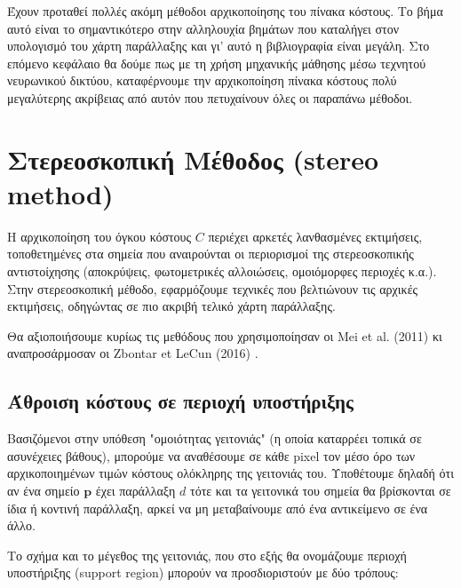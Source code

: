 Έχουν προταθεί πολλές ακόμη μέθοδοι αρχικοποίησης του πίνακα κόστους. Το βήμα αυτό είναι το σημαντικότερο στην αλληλουχία βημάτων που καταλήγει στον υπολογισμό του χάρτη παράλλαξης και γι' αυτό η βιβλιογραφία είναι μεγάλη. Στο επόμενο κεφάλαιο θα δούμε πως με τη χρήση μηχανικής μάθησης μέσω τεχνητού νευρωνικού δικτύου, καταφέρνουμε την αρχικοποίηση πίνακα κόστους πολύ μεγαλύτερης ακρίβειας από αυτόν που πετυχαίνουν όλες οι παραπάνω μέθοδοι.


\section{Στερεοσκοπική Μέθοδος \texorpdfstring{\e (stereo method) \g}{TEXT}}

Η αρχικοποίηση του όγκου κόστους $C$ περιέχει αρκετές λανθασμένες εκτιμήσεις, τοποθετημένες στα σημεία που αναιρούνται οι περιορισμοί της στερεοσκοπικής αντιστοίχησης (αποκρύψεις, φωτομετρικές αλλοιώσεις, ομοιόμορφες περιοχές κ.α.). Στην στερεοσκοπική μέθοδο, εφαρμόζουμε τεχνικές που βελτιώνουν τις αρχικές εκτιμήσεις, οδηγώντας σε πιο ακριβή τελικό χάρτη παράλλαξης.

Θα αξιοποιήσουμε κυρίως τις μεθόδους που χρησιμοποίησαν οι \e Mei et al. \g (2011) \cite{mei2011building} κι αναπροσάρμοσαν οι \e Zbontar et LeCun (2016) \g \cite{zbontar2016stereo}.

\subsection{Άθροιση κόστους σε περιοχή υποστήριξης}

Βασιζόμενοι στην υπόθεση "ομοιότητας γειτονιάς" (η οποία καταρρέει τοπικά σε ασυνέχειες βάθους), μπορούμε να αναθέσουμε σε κάθε \e pixel \g τον μέσο όρο των αρχικοποιημένων τιμών κόστους ολόκληρης της γειτονιάς του. Υποθέτουμε δηλαδή ότι αν ένα σημείο $\mathbf{p}$ έχει παράλλαξη $d$ τότε και τα γειτονικά του σημεία θα βρίσκονται σε ίδια ή κοντινή παράλλαξη, αρκεί να μη μεταβαίνουμε από ένα αντικείμενο σε ένα άλλο.

Το σχήμα και το μέγεθος της γειτονιάς, που στο εξής θα ονομάζουμε περιοχή υποστήριξης \e (support region) \g μπορούν να προσδιοριστούν με δύο τρόπους:

